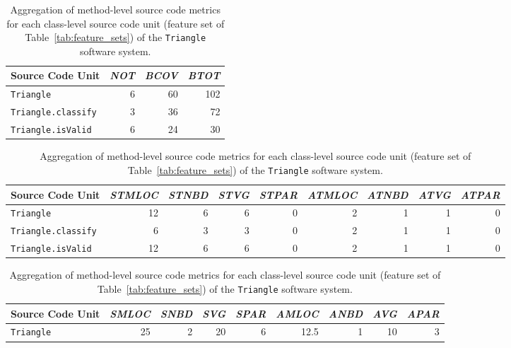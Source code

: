 \begin{table}
  \centering
  \caption{Extracted coverage test suite metrics (feature set  of Table~\ref{tab:feature_sets}) of the \texttt{Triangle} software system.}
  \label{tab:triangle_coverage_metrics}
  \begin{tabular}{|l|r|r|r|}
    \hline
    \rowcolor[RGB]{169,196,223}
    \textbf{Source Code Unit} & \textbf{\emph{NOT}} & \textbf{\emph{BCOV}} & \textbf{\emph{BTOT}} \\
    \hline \texttt{Triangle} & 6 & 60 & 102 \\
    \hline \texttt{Triangle.classify} & 3 & 36 & 72 \\
    \hline \texttt{Triangle.isValid} & 6 & 24 & 30 \\
    \hline
  \end{tabular}
  
  \vspace{3em}
  
  \centering
  \caption{Merged test suite metrics (feature set  in Table~\ref{tab:feature_sets}) for each source code unit of the \texttt{Triangle} software system.}
  \label{tab:triangle_merge_test_metrics}
  \begin{tabular}{|l|r|r|r|r|r|r|r|r|}
    \hline
    \rowcolor[RGB]{169,196,223}
    \textbf{Source Code Unit} & \textbf{\emph{STMLOC}} & \textbf{\emph{STNBD}} & \textbf{\emph{STVG}} & \textbf{\emph{STPAR}} & \textbf{\emph{ATMLOC}} & \textbf{\emph{ATNBD}} & \textbf{\emph{ATVG}} & \textbf{\emph{ATPAR}}  \\
    \hline \texttt{Triangle} & 12 & 6 & 6 & 0 & 2 & 1 & 1 & 0 \\
    \hline \texttt{Triangle.classify} & 6 & 3 & 3 & 0 & 2 & 1 & 1 & 0 \\
    \hline \texttt{Triangle.isValid} & 12 & 6 & 6 & 0 & 2 & 1 & 1 & 0 \\
    \hline
  \end{tabular}

  \vspace{3em}

  \centering
  \caption{Aggregation of method-level source code metrics for each class-level source code unit (feature set  of Table~\ref{tab:feature_sets}) of the \texttt{Triangle} software system.}
  \label{tab:triangle_aggregate_metrics}
  \begin{tabular}{|l|r|r|r|r|r|r|r|r|}
    \hline
    \rowcolor[RGB]{169,196,223}
    \textbf{Source Code Unit} & \textbf{\emph{SMLOC}} & \textbf{\emph{SNBD}} & \textbf{\emph{SVG}} & \textbf{\emph{SPAR}} & \textbf{\emph{AMLOC}} & \textbf{\emph{ANBD}} & \textbf{\emph{AVG}} & \textbf{\emph{APAR}}  \\
    \hline \texttt{Triangle} & 25 & 2 & 20 & 6 & 12.5 & 1 & 10 & 3 \\
    \hline
  \end{tabular}
\end{table}



